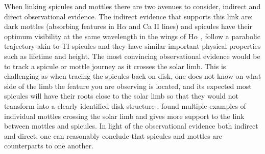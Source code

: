 \documentclass[12pt]{ociamthesis}
\begin{document}
%
When linking spicules and mottles there are two avenues to consider, indirect and direct observational evidence. The indirect evidence that supports this link are: dark mottles (absorbing features in H$\alpha$ and Ca II lines) and spicules have their optimum visibility at the same wavelength in the wings of H$\alpha$ \citep{Tsiropoula1993A}, follow a parabolic trajectory akin to TI spicules \citep{Rouppe2007ApJ660L169R} and they have similar important physical properties such as lifetime and height. The most convincing observational evidence would be to track a spicule or mottle journey as it crosses the solar limb. This is challenging as when tracing the spicules back on disk, one does not know on what side of the limb the feature you are observing is located, and its expected most spicules will have their roots close to the solar limb so that they would not transform into a clearly identified disk structure \citep{Beckers1968}. \cite{Christopoulou2001SoPh19961C} found multiple examples of individual mottles crossing the solar limb and gives more support to the link between mottles and spicules. In light of the observational evidence both indirect and direct, one can reasonably conclude that spicules and mottles are counterparts to one another.
\end{document}
